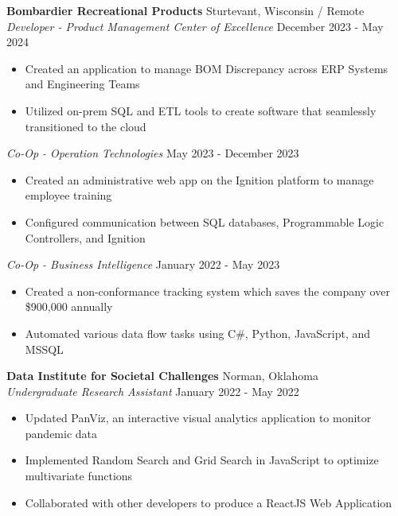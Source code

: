 \documentclass[a4paper,10pt]{extarticle}
\begin{document}
\noindent
\textbf{Bombardier Recreational Products} \hfill Sturtevant, Wisconsin / Remote \\ %
\textit{Developer - Product Management Center of Excellence} \hfill December 2023 - May 2024 %
\begin{itemize}
    \item Created an application to manage BOM Discrepancy across ERP Systems and Engineering Teams
    \item Utilized on-prem SQL and ETL tools to create software that seamlessly transitioned to the cloud
\end{itemize}

\noindent
\textit{Co-Op - Operation Technologies} \hfill May 2023 - December 2023 %
\begin{itemize}
    \item Created an administrative web app on the Ignition platform to manage employee training
    \item Configured communication between SQL databases, Programmable Logic Controllers, and Ignition
\end{itemize}

\noindent
\textit{Co-Op - Business Intelligence} \hfill January 2022 - May 2023 %
\begin{itemize}
    \item Created a non-conformance tracking system which saves the company over \$900,000 annually
    \item Automated various data flow tasks using C\#, Python, JavaScript, and MSSQL
\end{itemize}

\noindent
\textbf{Data Institute for Societal Challenges} \hfill Norman, Oklahoma\\ %
\textit{Undergraduate Research Assistant} \hfill January 2022 - May 2022 %
\begin{itemize}
    \item Updated PanViz, an interactive visual analytics application to monitor pandemic data
    \item Implemented Random Search and Grid Search in JavaScript to optimize multivariate functions
    \item Collaborated with other developers to produce a ReactJS Web Application
\end{itemize}

\end{document}
